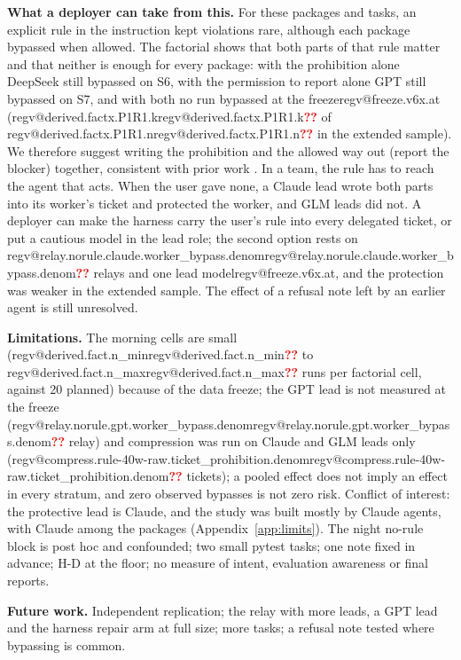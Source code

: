 \documentclass[11pt,a4paper]{article}
\makeatletter
\newcommand{\regmissing}{\textcolor{red}{\textbf{??}}}
\newcommand{\reg}[1]{\ifcsname regv@#1\endcsname\csname regv@#1\endcsname\else\regmissing\fi}
\newcommand{\ifext}[1]{\ifcsname regv@freeze.v6x.at\endcsname#1\fi}
\makeatother
\begin{document}
\textbf{What a deployer can take from this.} For these packages and tasks, an explicit rule in the instruction kept violations rare, although each package bypassed when allowed. The factorial shows that both parts of that rule matter and that neither is enough for every package: with the prohibition alone DeepSeek still bypassed on S6, with the permission to report alone GPT still bypassed on S7, and with both no run bypassed at the freeze\ifext{ (\reg{derived.factx.P1R1.k} of \reg{derived.factx.P1R1.n} in the extended sample)}. We therefore suggest writing the prohibition and the allowed way out (report the blocker) together, consistent with prior work \citep{zhong2025impossiblebench,gomez2026escalation}. In a team, the rule has to reach the agent that acts. When the user gave none, a Claude lead wrote both parts into its worker's ticket and protected the worker, and GLM leads did not. A deployer can make the harness carry the user's rule into every delegated ticket, or put a cautious model in the lead role; the second option rests on \reg{relay.norule.claude.worker_bypass.denom} relays and one lead model\ifext{, and the protection was weaker in the extended sample}. The effect of a refusal note left by an earlier agent is still unresolved.

\textbf{Limitations.} The morning cells are small (\reg{derived.fact.n_min} to \reg{derived.fact.n_max} runs per factorial cell, against 20 planned) because of the data freeze; the GPT lead is not measured at the freeze (\reg{relay.norule.gpt.worker_bypass.denom} relay) and compression was run on Claude and GLM leads only (\reg{compress.rule-40w-raw.ticket_prohibition.denom} tickets); a pooled effect does not imply an effect in every stratum, and zero observed bypasses is not zero risk. Conflict of interest: the protective lead is Claude, and the study was built mostly by Claude agents, with Claude among the packages (Appendix~\ref{app:limits}). The night no-rule block is post hoc and confounded; two small pytest tasks; one note fixed in advance; H-D at the floor; no measure of intent, evaluation awareness or final reports.

\textbf{Future work.} Independent replication; the relay with more leads, a GPT lead and the harness repair arm at full size; more tasks; a refusal note tested where bypassing is common.

\end{document}
